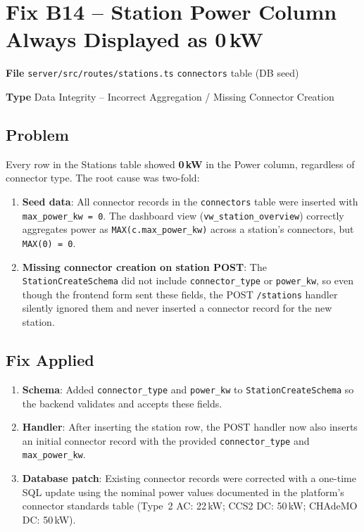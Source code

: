 \documentclass[12pt,a4paper]{report}
\newcommand{\inforow}[2]{%
	\noindent
	\begin{tcolorbox}[
		colback   = lightblue,
		colframe  = midblue,
		arc       = 2pt,
		left      = 6pt, right = 6pt, top = 2pt, bottom = 2pt,
		sidebyside, sidebyside align = top seam,
		lefthand width = 3.2cm,
		segmentation hidden,
		]
		\textbf{\color{brandblue}\small #1}
		\tcblower
		{\small\color{labelgray} #2}
	\end{tcolorbox}\vspace{2pt}%
}
\newcommand{\file}[1]{\texttt{\small #1}}
\begin{document}
	\section{Fix B14 -- Station Power Column Always Displayed as 0\,kW}

	\inforow{File}{\file{server/src/routes/stations.ts} \quad \file{connectors} table (DB seed)}
	\inforow{Type}{Data Integrity -- Incorrect Aggregation / Missing Connector Creation}

	\subsection*{Problem}

	Every row in the Stations table showed \textbf{0\,kW} in the Power column, regardless
	of connector type. The root cause was two-fold:

	\begin{enumerate}
		\item \textbf{Seed data}: All connector records in the \texttt{connectors} table
		      were inserted with \texttt{max\_power\_kw = 0}. The dashboard view
		      (\texttt{vw\_station\_overview}) correctly aggregates power as
		      \texttt{MAX(c.max\_power\_kw)} across a station's connectors, but
		      \texttt{MAX(0) = 0}.

		\item \textbf{Missing connector creation on station POST}: The
		      \texttt{StationCreateSchema} did not include \texttt{connector\_type} or
		      \texttt{power\_kw}, so even though the frontend form sent these fields, the
		      POST \texttt{/stations} handler silently ignored them and never inserted a
		      connector record for the new station.
	\end{enumerate}

	\subsection*{Fix Applied}

	\begin{enumerate}
		\item \textbf{Schema}: Added \texttt{connector\_type} and \texttt{power\_kw} to
		      \texttt{StationCreateSchema} so the backend validates and accepts these fields.
		\item \textbf{Handler}: After inserting the station row, the POST handler now also
		      inserts an initial connector record with the provided \texttt{connector\_type}
		      and \texttt{max\_power\_kw}.
		\item \textbf{Database patch}: Existing connector records were corrected with a one-time
		      SQL update using the nominal power values documented in the platform's connector
		      standards table (Type~2 AC: 22\,kW; CCS2 DC: 50\,kW; CHAdeMO DC: 50\,kW).
	\end{enumerate}
\end{document}

